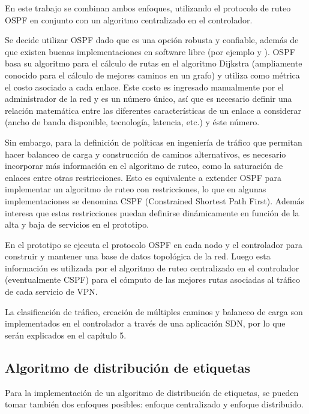 En este trabajo se combinan ambos enfoques, utilizando el protocolo de ruteo OSPF en conjunto con un algoritmo centralizado en el controlador.

Se decide utilizar OSPF dado que es una opción robusta y confiable, adem\'as de que existen buenas implementaciones en software libre (por ejemplo  \cite{Quagga} y \cite{BIRD}). OSPF basa su algoritmo para el c\'alculo de rutas en el algoritmo Dijkstra (ampliamente conocido para el c\'alculo de mejores caminos en un grafo) y utiliza como m\'etrica el costo asociado a cada enlace. Este costo es ingresado manualmente por el administrador de la red y es un n\'umero \'unico, as\'i que es necesario definir una relaci\'on matem\'atica entre las diferentes caracter\'isticas de un enlace a considerar (ancho de banda disponible, tecnolog\'ia, latencia, etc.) y \'este n\'umero. 

Sin embargo, para la definición de políticas en ingeniería de tr\'afico que permitan hacer balanceo de carga y construcción de caminos alternativos, es necesario incorporar m\'as informaci\'on en el algoritmo de ruteo, como la saturaci\'on de enlaces entre otras restricciones. Esto es equivalente a extender OSPF para implementar un algoritmo de ruteo con restricciones, lo que en algunas implementaciones se denomina CSPF (Constrained Shortest Path First). Adem\'as interesa que estas restricciones puedan definirse din\'amicamente en función de la alta y baja de servicios en el prototipo.

En el prototipo se ejecuta el protocolo OSPF en cada nodo y el controlador para construir y mantener una base de datos topol\'ogica de la red. Luego esta información es utilizada por el algoritmo de ruteo centralizado en el controlador (eventualmente CSPF) para el c\'omputo de las mejores rutas asociadas al tr\'afico de cada servicio de VPN.

La clasificaci\'on de tr\'afico, creación de m\'ultiples caminos y balanceo de carga son implementados en el controlador a través de una aplicaci\'on SDN, por lo que ser\'an explicados en el cap\'itulo 5.

\subsection{Algoritmo de distribución de etiquetas}

Para la implementaci\'on de un algoritmo de distribución de etiquetas, se pueden tomar también dos enfoques posibles: enfoque centralizado y enfoque distribuido.

